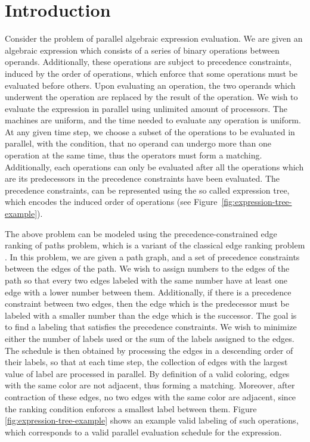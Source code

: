 \section{Introduction}
\label{sec:introduction}

Consider the problem of parallel algebraic expression evaluation. We are given an algebraic expression which consists of a series of binary operations between operands. Additionally, these operations are subject to precedence constraints, induced by the order of operations, which enforce that some operations must be evaluated before others. Upon evaluating an operation, the two operands which underwent the operation are replaced by the result of the operation. We wish to evaluate the expression in parallel using unlimited amount of processors. The machines are uniform, and the time needed to evaluate any operation is uniform. At any given time step, we choose a subset of the operations to be evaluated in parallel, with the condition, that no operand can undergo more than one operation at the same time, thus the operators must form a matching. Additionally, each operations can only be evaluated after all the operations which are its predecessors in the precedence constraints have been evaluated. The precedence constraints, can be represented using the so called expression tree, which encodes the induced order of operations (see Figure~\ref{fig:expression-tree-example}).



The above problem can be modeled using the precedence-constrained edge ranking of paths problem, which is a variant of the classical edge ranking problem \cite{ParallelAssemblyOfModularProducts,EdgeRankingOfWeightedTrees}. In this problem, we are given a path graph, and a set of precedence constraints between the edges of the path. We wish to assign numbers to the edges of the path so that every two edges labeled with the same number have at least one edge with a lower number between them. Additionally, if there is a precedence constraint between two edges, then the edge which is the predecessor must be labeled with a smaller number than the edge which is the successor. The goal is to find a labeling that satisfies the precedence constraints. We wish to minimize either the number of labels used or the sum of the labels assigned to the edges. The schedule is then obtained by processing the edges in a descending order of their labels, so that at each time step, the collection of edges with the largest value of label are processed in parallel. By definition of a valid coloring, edges with the same color are not adjacent, thus forming a matching. Moreover, after contraction of these edges, no two edges with the same color are adjacent, since the ranking condition enforces a smallest label between them. Figure \ref{fig:expression-tree-example} shows an example valid labeling of such operations, which corresponds to a valid parallel evaluation schedule for the expression.

